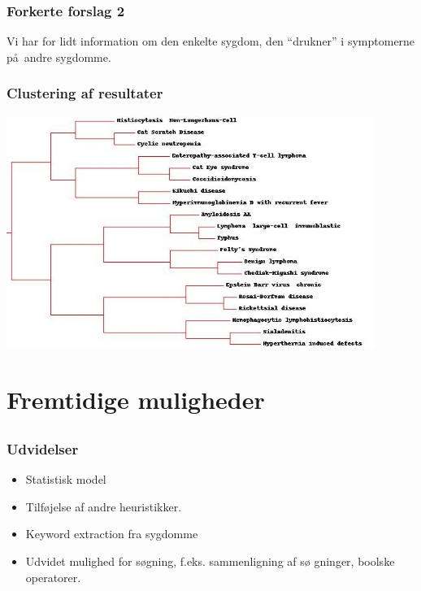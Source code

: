 \documentclass[xcolor=table]{beamer}
\begin{document}
\begin{frame}

  \frametitle{Forkerte forslag 2}

  Vi har for lidt information om den enkelte sygdom, den ``drukner'' i symptomerne p\aa\ andre sygdomme.

\end{frame}

\begin{frame}

  \frametitle{Clustering af resultater}

  \begin{center}
    \includegraphics[width=0.90\textwidth]{diagram/cluster_cat_scratch.jpg}
  \end{center}

\end{frame}

\section{Fremtidige muligheder}

\subsection*{}

\begin{frame}

  \frametitle{Udvidelser}

  \begin{itemize}
    \item Statistisk model
    \item Tilf\o jelse af andre heuristikker.
    \item Keyword extraction fra sygdomme
    \item Udvidet mulighed for s\o gning, f.eks. sammenligning af s\o
      gninger, boolske operatorer.
  \end{itemize}

\end{frame}
\end{document}

